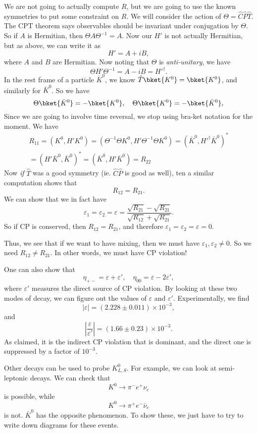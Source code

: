 \documentclass[a4paper]{article}
\begin{document}
We are not going to actually compute $R$, but we are going to use the known symmetries to put some constraint on $R$. We will consider the action of $\Theta = \hat{C}\hat{P}\hat{T}$. The CPT theorem says observables should be invariant under conjugation by $\Theta$. So if $A$ is Hermitian, then $\Theta A \Theta^{-1} = A$. Now our $H'$ is not actually Hermitian, but as above, we can write it as
\[
  H' = A + i B,
\]
where $A$ and $B$ are Hermitian. Now noting that $\Theta$ is \emph{anti-unitary}, we have
\[
  \Theta H' \Theta^{-1} = A - iB = H'^\dagger.
\]
In the rest frame of a particle $\bar{K}^0$, we know $\hat{T} \bket{K^0} = \bket{K^0}$, and similarly for $\bar{K}^0$. So we have
\[
  \Theta \bket{\bar{K}^0} = - \bket{K^0},\quad \Theta \bket{K^0} = - \bket{\bar{K}^0},
\]
Since we are going to involve time reversal, we stop using bra-ket notation for the moment. We have
\begin{multline*}
  R_{11} = (K^0, H' K^0)
  = (\Theta^{-1}\Theta K^0, H' \Theta^{-1}\Theta K^0)
  = (\bar{K}^0, H'^\dagger \bar{K}^0)^*\\
  = (H' \bar{K}^0, \bar{K}^0)^*
  = (\bar K^0, H' \bar{K}^0)
  = R_{22}
\end{multline*}
Now \emph{if} $\hat{T}$ was a good symmetry (ie. $\hat{C}\hat{P}$ is good as well), ten a similar computation shows that
\[
  R_{12} = R_{21}.
\]
We can show that we in fact have %
\[
  \varepsilon_1 = \varepsilon_2 = \varepsilon = \frac{\sqrt{R_{21}} - \sqrt{R_{21}}}{\sqrt{R_{12}} + \sqrt{R_{21}}}.
\]
So if CP is conserved, then $R_{12} = R_{21}$, and therefore $\varepsilon_1 = \varepsilon_2 = \varepsilon = 0$.

Thus, we see that if we want to have mixing, then we must have $\varepsilon_1, \varepsilon_2 \not= 0$. So we need $R_{12} \not =R_{21}$. In other words, we must have CP violation!

One can also show that
\[
  \eta_{+-} = \varepsilon + \varepsilon',\quad \eta_{00} = \varepsilon - 2 \varepsilon',
\]
where $\varepsilon'$ measures the direct source of CP violation. By looking at these two modes of decay, we can figure out the values of $\varepsilon$ and $\varepsilon'$. Experimentally, we find
\[
  |\varepsilon| = (2.228 \pm 0.011) \times 10^{-3},
\]
and
\[
  \left|\frac{\varepsilon}{\varepsilon'}\right| = (1.66 \pm 0.23) \times 10^{-3}.
\]
As claimed, it is the indirect CP violation that is dominant, and the direct one is suppressed by a factor of $10^{-3}$.

Other decays can be used to probe $K_{L, S}^0$. For example, we can look at semi-leptonic decays. We can check that
\[
  K^0 \to \pi^- e^+ \nu_e
\]
is possible, while
\[
  K^0 \to \pi^+ e^- \bar{\nu}_e
\]
is not. $\bar{K}^0$ has the opposite phenomenon. To show these, we just have to try to write down diagrams for these events. %
\end{document}

